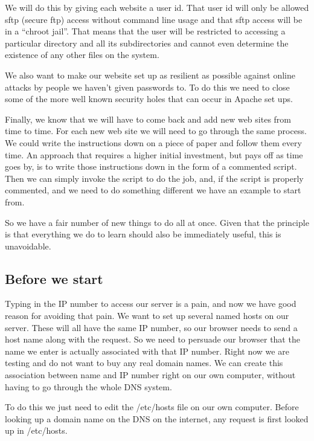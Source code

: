 \documentclass[12pt, a4paper]{article}
\begin{document}
We will do this by giving each website a user id. That user id will only be allowed sftp (secure ftp) access without command line usage and that sftp access will be in a “chroot jail”. That means that the user will be restricted to accessing a particular directory and all its subdirectories and cannot even determine the existence of any other files on the system.

We also want to make our website set up as resilient as possible against online attacks by people we haven’t given passwords to. To do this we need to close some of the more well known security holes that can occur in Apache set ups. 

Finally, we know that we will have to come back and add new web sites from time to time. For each new web site we will need to go through the same process. We could write the instructions down on a piece of paper and follow them every time. An approach that requires a higher initial investment, but pays off as time goes by, is to write those instructions down in the form of a commented script. Then we can simply invoke the script to do the job, and, if the script is properly commented, and we need to do something different we have an example to start from.

So we have a fair number of new things to do all at once. Given that the principle is that everything we do to learn should also be immediately useful, this is unavoidable.

\subsection*{Before we start} 

Typing in the IP number to access our server is a pain, and now we have good reason for avoiding that pain. We want to set up several named hosts on our server. These will all have the same IP number, so our browser needs to send a host name along with the request. So we need to persuade our browser that the name we enter is actually associated with that IP number. Right now we are testing and do not want to buy any real domain names. We can create this association between name and IP number right on our own computer, without having to go through the whole DNS system.

To do this we just need to edit the /etc/hosts file on our own computer. Before looking up a domain name on the DNS on the internet, any request is first looked up in /etc/hosts.
\end{document}
